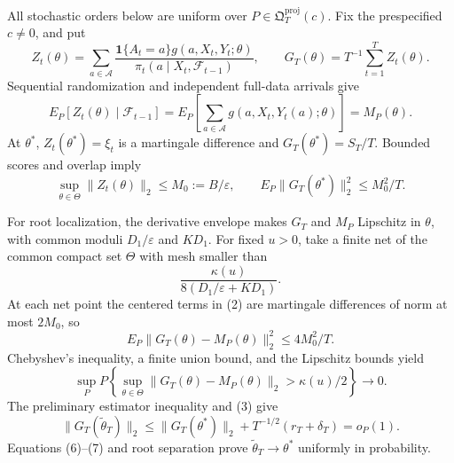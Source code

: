 All stochastic orders below are uniform over \(P\in\mathfrak Q_T^{\mathrm{proj}}(c)\). Fix the prespecified \(c\ne0\), and put
\[
 Z_t(\theta)=\sum_{a\in\mathcal A}
 \frac{\mathbf1\{A_t=a\}g(a,X_t,Y_t;\theta)}
 {\pi_t(a\mid X_t,\mathcal F_{t-1})},
 \qquad G_T(\theta)=T^{-1}\sum_{t=1}^TZ_t(\theta).
\tag{1}
\]
Sequential randomization and independent full-data arrivals give
\[
 E_P[Z_t(\theta)\mid\mathcal F_{t-1}]
 =E_P\!\left[\sum_{a\in\mathcal A}g(a,X_t,Y_t(a);\theta)\right]
 =M_P(\theta).
\tag{2}
\]
At \(\theta^*\), \(Z_t(\theta^*)=\xi_t\) is a martingale difference and \(G_T(\theta^*)=S_T/T\). Bounded scores and overlap imply
\[
 \sup_{\theta\in\Theta}\|Z_t(\theta)\|_2\le M_0:=B/\varepsilon,
 \qquad E_P\|G_T(\theta^*)\|_2^2\le M_0^2/T.
\tag{3}
\]

For root localization, the derivative envelope makes \(G_T\) and \(M_P\) Lipschitz in \(\theta\), with common moduli \(D_1/\varepsilon\) and \(KD_1\). For fixed \(u>0\), take a finite net of the common compact set \(\Theta\) with mesh smaller than
\[
 \frac{\kappa(u)}{8(D_1/\varepsilon+KD_1)}.
\tag{4}
\]
At each net point the centered terms in (2) are martingale differences of norm at most \(2M_0\), so
\[
 E_P\|G_T(\theta)-M_P(\theta)\|_2^2\le4M_0^2/T.
\tag{5}
\]
Chebyshev's inequality, a finite union bound, and the Lipschitz bounds yield
\[
 \sup_P P\!\left\{\sup_{\theta\in\Theta}
 \|G_T(\theta)-M_P(\theta)\|_2>\kappa(u)/2\right\}\longrightarrow0.
\tag{6}
\]
The preliminary estimator inequality and (3) give
\[
 \|G_T(\widetilde\theta_T)\|_2
 \le\|G_T(\theta^*)\|_2+T^{-1/2}(r_T+\delta_T)=o_P(1).
\tag{7}
\]
Equations (6)--(7) and root separation prove \(\widetilde\theta_T\to\theta^*\) uniformly in probability.

